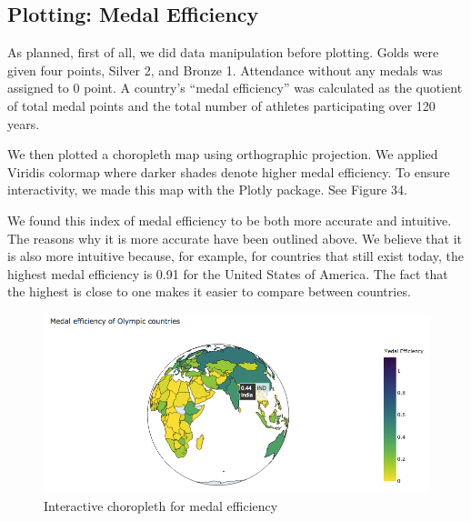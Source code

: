 \documentclass[12pt]{article}
\begin{document}
\subsection{Plotting: Medal Efficiency}
As planned, first of all, we did data manipulation before plotting. Golds were given four points, Silver 2, and Bronze 1. Attendance without any medals was assigned to 0 point. A country’s “medal efficiency” was calculated as the quotient of total medal points and the total number of athletes participating over 120 years. 

We then plotted a choropleth map using orthographic projection. We applied Viridis colormap where darker shades denote higher medal efficiency. To ensure interactivity, we made this map with the Plotly package. See Figure 34.

We found this index of medal efficiency to be both more accurate and intuitive. The reasons why it is more accurate have been outlined above. We believe that it is also more intuitive because, for example, for countries that still exist today, the highest medal efficiency is 0.91 for the United States of America. The fact that the highest is close to one makes it easier to compare between countries. 

\begin{figure}[!b]
    \centering
    \includegraphics[scale=0.55]{pics/g-3-1.png}
    \caption{Interactive choropleth for medal efficiency}
    \label{fig:my_label}
\end{figure}
\end{document}
